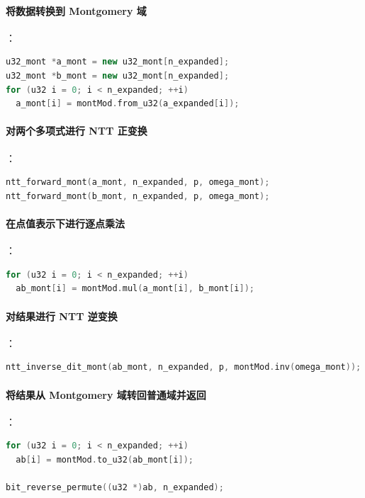 \documentclass[a4paper]{article}
\begin{document}
\paragraph{将数据转换到 Montgomery 域}

：

\begin{lstlisting}[language=C++]
u32_mont *a_mont = new u32_mont[n_expanded];
u32_mont *b_mont = new u32_mont[n_expanded];
for (u32 i = 0; i < n_expanded; ++i)
  a_mont[i] = montMod.from_u32(a_expanded[i]);
\end{lstlisting}

\paragraph{对两个多项式进行 NTT 正变换}

：

\begin{lstlisting}[language=C++]
ntt_forward_mont(a_mont, n_expanded, p, omega_mont);
ntt_forward_mont(b_mont, n_expanded, p, omega_mont);
\end{lstlisting}

\paragraph{在点值表示下进行逐点乘法}

：

\begin{lstlisting}[language=C++]
for (u32 i = 0; i < n_expanded; ++i)
  ab_mont[i] = montMod.mul(a_mont[i], b_mont[i]);
\end{lstlisting}

\paragraph{对结果进行 NTT 逆变换}

：

\begin{lstlisting}[language=C++]
ntt_inverse_dit_mont(ab_mont, n_expanded, p, montMod.inv(omega_mont));
\end{lstlisting}

\paragraph{将结果从 Montgomery 域转回普通域并返回}

：

\begin{lstlisting}[language=C++]
for (u32 i = 0; i < n_expanded; ++i)
  ab[i] = montMod.to_u32(ab_mont[i]);

bit_reverse_permute((u32 *)ab, n_expanded);
\end{lstlisting}
\end{document}
